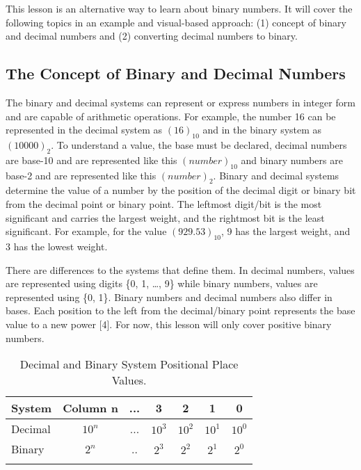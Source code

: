 \documentclass[twocolumn, 10pt]{article}
\begin{document}
This lesson is an alternative way to learn about binary numbers. It will cover the following topics in an example and visual-based approach: (1) concept of binary and decimal numbers and (2) converting decimal numbers to binary. 

\subsection{The Concept of Binary and Decimal Numbers}
The binary and decimal systems can represent or express numbers in integer form and are capable of arithmetic operations. For example, the number 16 can be represented in the decimal system as $(16)_{10}$ and in the binary system as $(10000)_{2}$. To understand a value, the base must be declared, decimal numbers are base-10 and are represented like this $(number)_{10}$ and binary numbers are base-2 and are represented like this $(number)_{2}$. 
\newline \newline
Binary and decimal systems determine the value of a number by the position of the decimal digit or binary bit from the decimal point or binary point. The leftmost digit/bit is the most significant and carries the largest weight, and the rightmost bit is the least significant. For example, for the value $(929.53)_{10}$, 9 has the largest weight, and 3 has the lowest weight.  

There are differences to the systems that define them. In decimal numbers, values are represented using digits \{0, 1, …, 9\} while binary numbers, values are represented using \{0, 1\}. Binary numbers and decimal numbers also differ in bases. Each position to the left from the decimal/binary point represents the base value to a new power [4]. For now, this lesson will only cover positive binary numbers. 

\begin{table}[ht]
\centering
\caption{Decimal and Binary System Positional Place Values.}
\begin{tabular}[t]{lcccccc}
\hline
System&Column n&...&3&2&1&0\\
\hline
Decimal&$10^{n}$&...&$10^{3}$&$10^{2}$&$10^{1}$&$10^{0}$\\
Binary &$2^{n}$&..&$2^{3}$&$2^{2}$&$2^{1}$&$2^{0}$\\

\hline
\label{table: table2}
\end{tabular}
\end{table}%
\end{document}
